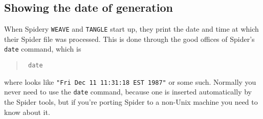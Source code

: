 \subsection{Showing the date of generation}
When Spidery {\tt WEAVE} and {\tt TANGLE} start up, they print the
date and time at which their {Spider} file was processed.
This is done through the good offices of {Spider}'s {\tt date}
command, which is
\begin{quote}
\tt
date 
\end{quote}
where  looks like {\tt "Fri Dec 11 11:31:18 EST 1987"} or
some such.
Normally you never need to use the {\tt date} command, because one is
inserted automatically by the {Spider} tools, but if you're
porting {Spider} to a non-Unix machine you need to know about it.




